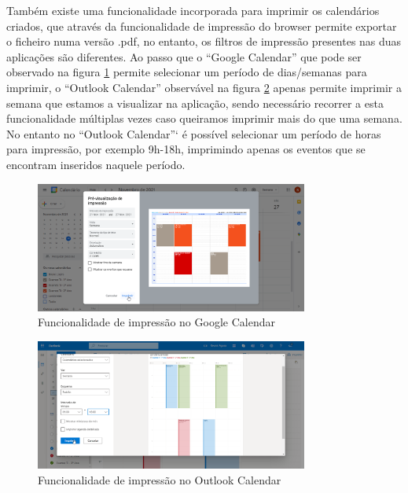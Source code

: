 \documentclass[11pt, twoside]{report}
\begin{document}
Também existe uma funcionalidade incorporada para imprimir os calendários criados, que através da funcionalidade de impressão do browser permite exportar o ficheiro numa versão .pdf, no entanto, os filtros de impressão presentes nas duas aplicações são diferentes. Ao passo que o ``Google Calendar'' que pode ser observado na figura \ref{googleexportar} permite selecionar um período de dias/semanas para imprimir, o ``Outlook Calendar'' observável na figura \ref{outlookexportar} apenas permite imprimir a semana que estamos a visualizar na aplicação, sendo necessário recorrer a esta funcionalidade múltiplas vezes caso queiramos imprimir mais do que uma semana. No entanto no ``Outlook Calendar''` é possível selecionar um período de horas para impressão, por exemplo 9h-18h, imprimindo apenas os eventos que se encontram inseridos naquele período.
	 
	\begin{figure}[H] 
		\centering
		\includegraphics[width=0.8\textwidth,height=0.8\textheight,keepaspectratio]{image/estadodearte/imprimir_google}
		\caption{Funcionalidade de impressão no Google Calendar}
		\label{googleexportar}
	\end{figure}

	\begin{figure}[H] 
		\centering
		\includegraphics[width=0.8\textwidth,height=0.8\textheight,keepaspectratio]{image/estadodearte/imprimir_outlook}
		\caption{Funcionalidade de impressão no Outlook Calendar}
		\label{outlookexportar}
	\end{figure}
	
\end{document}

